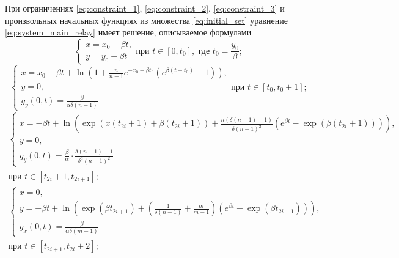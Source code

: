 \begin{theorem}
	При ограничениях \eqref{eq:constraint_1}, \eqref{eq:constraint_2}, \eqref{eq:constraint_3}  и произвольных начальных функциях из множества \eqref{eq:initial_set} уравнение \eqref{eq:system_main_relay} имеет решение, описываемое формулами
	\small
	\begin{equation}
		\label{eq:step1_solution}
		\begin{cases}
			x = x_0 - \beta t,\\
			y = y_0 - \beta t
		\end{cases}
		\text{при } t \in [0, t_0], \text{ где } t_0 = \dfrac{y_0}{\beta};
	\end{equation}
	\begin{equation}
		\label{eq:step2_solution}
		\begin{cases}
			x = x_0 - \beta t + \ln\left(1 + \frac{n}{n - 1} e^{-x_0 + \beta t_0}  (e^{\beta  (t - t_0)} - 1)\right),\\
			y = 0,\\
			g_y(0, t) = \frac{\beta}{\alpha \delta (n - 1)}
		\end{cases}
		\text{при } t \in [t_0, t_0 + 1];
	\end{equation}
	\begin{multline}
		\label{eq:step3_solution}
		\begin{cases}
			x = -\beta t + \ln\left(\exp(x(t_{2i} + 1) + \beta (t_{2i} + 1)) + \frac{n (\delta(n - 1) - 1)}{\delta (n - 1)^2} (e^{\beta t} - \exp(\beta (t_{2i} + 1)))\right)
			,\\
			y = 0,\\
			g_y(0, t) = \frac{\beta}{\alpha} \cdot \frac{\delta (n - 1) - 1}{\delta^2 (n - 1)^2}
		\end{cases}\\
		\text{при } t \in [t_{2i} + 1, t_{2i + 1}];
	\end{multline}
	\begin{multline}
		\label{eq:step4_solution}
		\begin{cases}
			x = 0,\\
			y = -\beta t + \ln\left(\exp(\beta t_{2i + 1}) + \left(\frac{1}{\delta(n - 1)} + \frac{m}{m - 1}\right) (e^{\beta t} - \exp(\beta t_{2i + 1}))\right),\\
			g_x(0, t) = \frac{\beta}{\alpha \delta (m - 1)}
		\end{cases}\\
		\text{при } t \in [t_{2i + 1}, t_{2i} + 2];
	\end{multline}
	\begin{multline}
		\label{eq:step5_solution}

\end{multline}
\end{theorem}
